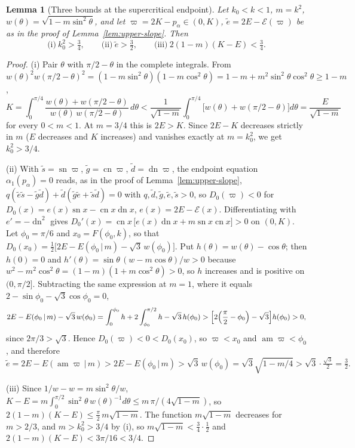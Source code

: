 \documentclass[11pt]{article}
\newtheorem{lemma}[theorem]{Lemma}
\theoremstyle{remark}
\newcommand{\sn}{\operatorname{sn}}
\newcommand{\cn}{\operatorname{cn}}
\newcommand{\dn}{\operatorname{dn}}
\newcommand{\am}{\operatorname{am}}
\newcommand{\epsi}{\mathcal{E}}
\begin{document}
\begin{lemma}[Three bounds at the supercritical endpoint]\label{lem:app-bounds}
Let $k_0<k<1$, $m=k^2$, $w(\theta)=\sqrt{1-m\sin^2\theta}$, and let
$\varpi=2K-p_\alpha\in(0,K)$, $\tilde e=2E-\epsi(\varpi)$ be as in the
proof of Lemma~\ref{lem:upper-slope}.  Then
\[
 \text{(i)}\ k_0^2>\tfrac34,\qquad
 \text{(ii)}\ \tilde e>\tfrac32,\qquad
 \text{(iii)}\ 2(1-m)(K-E)<\tfrac34 .
\]
\end{lemma}
\begin{proof}
(i) Pair $\theta$ with $\pi/2-\theta$ in the complete integrals.  From
$w(\theta)^2w(\pi/2-\theta)^2=(1-m\sin^2\theta)(1-m\cos^2\theta)
=1-m+m^2\sin^2\theta\cos^2\theta\ge1-m$,
\[
 K=\int_0^{\pi/4}\frac{w(\theta)+w(\pi/2-\theta)}{w(\theta)\,w(\pi/2-\theta)}\,d\theta
 <\frac1{\sqrt{1-m}}\int_0^{\pi/4}\bigl[w(\theta)+w(\pi/2-\theta)\bigr]d\theta
 =\frac{E}{\sqrt{1-m}}
\]
for every $0<m<1$.  At $m=3/4$ this is $2E>K$.  Since $2E-K$ decreases
strictly in $m$ ($E$ decreases and $K$ increases) and vanishes exactly at
$m=k_0^2$, we get $k_0^2>3/4$.

(ii) With $\tilde s=\sn\varpi$, $\tilde g=\cn\varpi$, $\tilde d=\dn\varpi$,
the endpoint equation $\alpha_1(p_\alpha)=0$ reads, as in the proof of
Lemma~\ref{lem:upper-slope},
$q(\tilde e\tilde s-\tilde g\tilde d)+\tilde d(\tilde g\tilde e+\tilde s\tilde d)=0$
with $q,\tilde d,\tilde g,\tilde e,\tilde s>0$, so $D_0(\varpi)<0$ for
$D_0(x)=e(x)\sn x-\cn x\dn x$, $e(x)=2E-\epsi(x)$.  Differentiating with
$e'=-\dn^2$ gives $D_0'(x)=\cn x\,\bigl[e(x)\dn x+m\sn x\cn x\bigr]>0$ on
$(0,K)$.  Let $\phi_0=\pi/6$ and $x_0=F(\phi_0,k)$, so that
$D_0(x_0)=\tfrac12\bigl[2E-E(\phi_0\,|\,m)-\sqrt3\,w(\phi_0)\bigr]$.  Put
$h(\theta)=w(\theta)-\cos\theta$; then $h(0)=0$ and
$h'(\theta)=\sin\theta\,(w-m\cos\theta)/w>0$ because
$w^2-m^2\cos^2\theta=(1-m)(1+m\cos^2\theta)>0$, so $h$ increases and is
positive on $(0,\pi/2]$.  Subtracting the same expression at $m=1$, where
it equals $2-\sin\phi_0-\sqrt3\cos\phi_0=0$,
\[
 2E-E(\phi_0\,|\,m)-\sqrt3\,w(\phi_0)
 =\int_0^{\phi_0}h+2\int_{\phi_0}^{\pi/2}h-\sqrt3\,h(\phi_0)
 >\Bigl[2\Bigl(\frac\pi2-\phi_0\Bigr)-\sqrt3\Bigr]h(\phi_0)>0,
\]
since $2\pi/3>\sqrt3$.  Hence $D_0(\varpi)<0<D_0(x_0)$, so $\varpi<x_0$
and $\am\varpi<\phi_0$, and therefore
\[
 \tilde e=2E-E(\am\varpi\,|\,m)>2E-E(\phi_0\,|\,m)>\sqrt3\,w(\phi_0)
 =\sqrt3\sqrt{1-m/4}>\sqrt3\cdot\tfrac{\sqrt3}2=\tfrac32 .
\]

(iii) Since $1/w-w=m\sin^2\theta/w$,
$K-E=m\int_0^{\pi/2}\sin^2\theta\,w(\theta)^{-1}d\theta\le
m\,\pi/(4\sqrt{1-m})$, so $2(1-m)(K-E)\le\tfrac\pi2\,m\sqrt{1-m}$.  The
function $m\sqrt{1-m}$ decreases for $m>2/3$, and $m>k_0^2>3/4$ by (i),
so $m\sqrt{1-m}<\tfrac34\cdot\tfrac12$ and
$2(1-m)(K-E)<3\pi/16<3/4$.
\end{proof}
\end{document}

